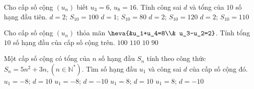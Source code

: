 \begin{ex}%
	Cho cấp số cộng $(u_n)$ biết $u_3=6$, $u_8=16$. Tính công sai $d$ và tổng của $10$ số hạng đầu tiên. 
	 \choice
		{$d=2$;  $S_{10}=100$}
		{$d=1$; $S_{10}=80$} 
		 {$d=2$; $S_{10}=120$}
		{\True  $d=2$; $S_{10}=110$}
\end{ex}

\begin{ex}%
	Cho cấp số cộng $(u_n)$ thỏa mãn $\heva{&u_1+u_4=8\\& u_3-u_2=2}$. Tính tổng $10$ số hạng đầu của cấp số  cộng trên.
	 \choice
		{\True  $100$}
		{$110$} 
		 {$10$}
		 {$90$}
\end{ex}

\begin{ex}%
	Một cấp số cộng có tổng của  $n$ số hạng đầu $S_n$ tính theo công thức $S_n=5n^2+3n, (n \in \mathbb{N}^*)$. Tìm số hạng đầu $u_1$ và công sai $d$ của cấp số cộng đó.
	 \choice
		{$u_1=-8$;  $d=10$}
		{$u_1=-8$; $d=-10$} 
		{\True $u_1=8$;  $d=10$}
		 {$u_1=8$; $d=-10$}
\end{ex}

